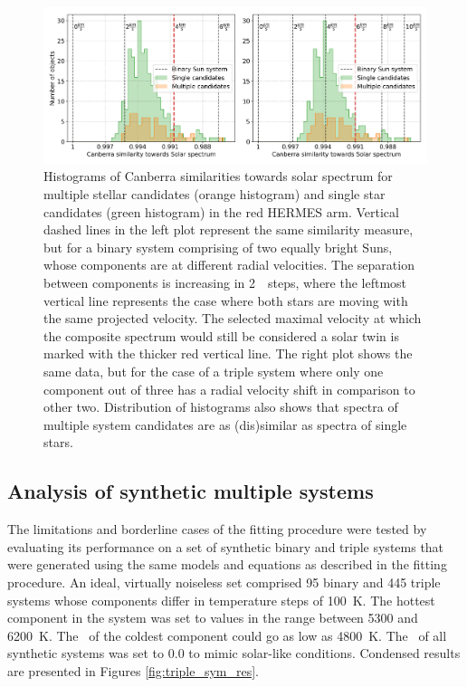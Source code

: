 \begin{figure}
	\centering
	\includegraphics[width=\textwidth]{sinlg_multi_sim_b3_50_50_comb.png}
	\caption{Histograms of Canberra similarities towards solar spectrum for multiple stellar candidates (orange histogram) and single star candidates (green histogram) in the red HERMES arm. Vertical dashed lines in the left plot represent the same similarity measure, but for a binary system comprising of two equally bright Suns, whose components are at different radial velocities. The separation between components is increasing in 2~\kms\ steps, where the leftmost vertical line represents the case where both stars are moving with the same projected velocity. The selected maximal velocity at which the composite spectrum would still be considered a solar twin is marked with the thicker red vertical line. The right plot shows the same data, but for the case of a triple system where only one component out of three has a radial velocity shift in comparison to other two. Distribution of histograms also shows that spectra of multiple system candidates are as (dis)similar as spectra of single stars.}
	\label{fig:rv_similarity}
\end{figure}

\subsection{Analysis of synthetic multiple systems}
The limitations and borderline cases of the fitting procedure were tested by evaluating its performance on a set of synthetic binary and triple systems that were generated using the same models and equations as described in the fitting procedure. An ideal, virtually noiseless set comprised 95 binary and 445 triple systems whose components differ in temperature steps of 100~K. The hottest component in the system was set to values in the range between 5300 and 6200~K. The \Teff\ of the coldest component could go as low as 4800~K. The \Feh\ of all synthetic systems was set to $0.0$ to mimic solar-like conditions. Condensed results are presented in Figures \ref{fig:triple_sym_res}.

